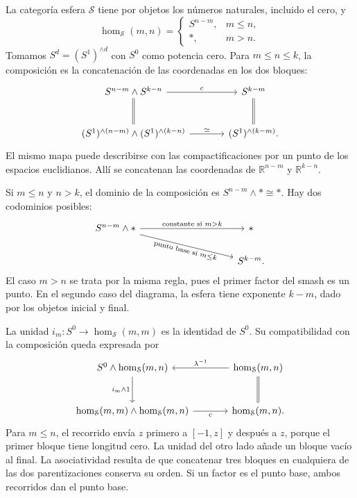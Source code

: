 \begin{ejem}\label{ejem:c26-categoria-esfera}
La categoría esfera $\mathcal S$ tiene por objetos los números naturales, incluido el cero, y
\[
\hom_{\mathcal S}(m,n)=
\begin{cases}
S^{n-m},&m\leq n,\\
*,&m>n.
\end{cases}
\]
Tomamos $S^d=(S^1)^{\wedge d}$ con $S^0$ como potencia cero. Para $m\leq n\leq k$, la composición es la concatenación de las coordenadas en los dos bloques:
\[
\begin{tikzcd}[column sep=large,row sep=large]
S^{n-m}\wedge S^{k-n}\arrow[r,"c"]\arrow[d,equal]&S^{k-m}\arrow[d,equal]\\
(S^1)^{\wedge(n-m)}\wedge(S^1)^{\wedge(k-n)}
\arrow[r,"\simeq"]&(S^1)^{\wedge(k-m)} .
\end{tikzcd}
\]
El mismo mapa puede describirse con las compactificaciones por un punto de los espacios euclidianos. Allí se concatenan las coordenadas de $\mathbb R^{n-m}$ y $\mathbb R^{k-n}$.

Si $m\leq n$ y $n>k$, el dominio de la composición es $S^{n-m}\wedge *\cong *$. Hay dos codominios posibles:
\[
\begin{tikzcd}[column sep={49mm,between origins},row sep={12mm,between origins},
    labels={sloped,inner sep=2pt}]
S^{n-m}\wedge *
\arrow[r,"\text{constante si }m>k"]
\arrow[dr,"\text{punto base si }m\leq k"']&*\\
&S^{k-m}.
\end{tikzcd}
\]
El caso $m>n$ se trata por la misma regla, pues el primer factor del smash es un punto. En el segundo caso del diagrama, la esfera tiene exponente $k-m$, dado por los objetos inicial y final.

La unidad $i_m\colon S^0\to\hom_{\mathcal S}(m,m)$ es la identidad de $S^0$. Su compatibilidad con la composición queda expresada por
\[
\begin{tikzcd}[column sep=large,row sep=large]
S^0\wedge\hom_{\mathcal S}(m,n)
\arrow[d,"i_m\wedge1"']&
\hom_{\mathcal S}(m,n)\arrow[l,"\lambda^{-1}"']\arrow[d,equal]\\
\hom_{\mathcal S}(m,m)\wedge\hom_{\mathcal S}(m,n)
\arrow[r,"c"']&\hom_{\mathcal S}(m,n).
\end{tikzcd}
\]
Para $m\leq n$, el recorrido envía $z$ primero a $[-1,z]$ y después a $z$, porque el primer bloque tiene longitud cero. La unidad del otro lado añade un bloque vacío al final. La asociatividad resulta de que concatenar tres bloques en cualquiera de las dos parentizaciones conserva su orden. Si un factor es el punto base, ambos recorridos dan el punto base.
\end{ejem}

